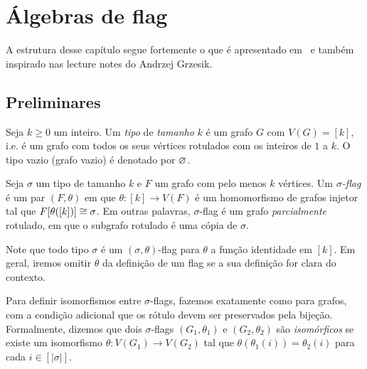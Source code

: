 \chapter{Álgebras de flag}
\label{cap:flag-algebras}



A estrutura desse capítulo segue fortemente o que é apresentado em~\cite{marcel2016flag} e também inspirado nas lecture notes do Andrzej Grzesik.

\section{Preliminares}

Seja $k \geq 0$ um inteiro.
Um \emph{tipo} de \emph{tamanho} $k$ é um grafo $G$ com $V(G) = [k]$,
i.e. é um grafo com todos os seus vértices rotulados com os inteiros de $1$ a $k$.
O tipo vazio (grafo vazio) é denotado por $\varnothing$.

Seja $\sigma$ um tipo de tamanho $k$ e $F$ um grafo com pelo menos $k$ vértices.
Um \emph{$\sigma$-flag} é um par $(F,\theta)$ em que $\theta \colon [k] \to V(F)$
é um homomorfismo de grafos injetor tal que $F[\theta([k])] \cong \sigma$.
Em outras palavras, $\sigma$-flag é um grafo \emph{parcialmente} rotulado, em que o subgrafo rotulado é uma cópia de $\sigma$.

Note que todo tipo $\sigma$ é um $(\sigma,\theta)$-flag para $\theta$ a função identidade em $[k]$.
Em geral, iremos omitir $\theta$ da definição de um flag se a sua definição for clara do contexto.

Para definir isomorfismos entre $\sigma$-flags, fazemos exatamente como para grafos, com a condição adicional que os rótulo devem ser preservados pela bijeção.
Formalmente, dizemos que dois $\sigma$-flags $(G_1,\theta_1)$ e $(G_2,\theta_2)$ são \emph{isomórficos} se existe um isomorfismo $\theta \colon V(G_1) \to V(G_2)$ tal que $\theta(\theta_1(i))=\theta_2(i)$ para cada $i \in [|\sigma|]$.

